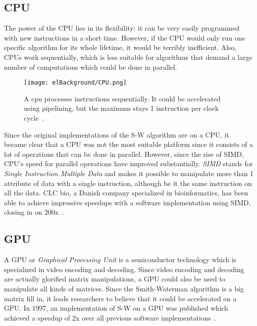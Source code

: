 \subsection{CPU}

The power of the CPU lies in its flexibility: it can be very easily programmed with new instructions in a short time. However, if the CPU would only run one specific algorithm for its whole lifetime, it would be terribly inefficient. Also, CPUs work sequentially, which is less suitable for algorithms that demand a large number of computations which could be done in parallel.

\begin{figure}[H]
	\centering
	\texttt{[image: elBackground/CPU.png]}
	\caption{A cpu processes instructions sequentially. It could be accelerated using pipelining, but the maximum stays 1 instruction per clock cycle~\cite{10}.}
	\label{fig:cpu}
\end{figure}

Since the original implementations of the S-W algorithm are on a CPU, it became clear that a CPU was not the most suitable platform since it consists of a lot of operations that can be done in parallel. However, since the rise of SIMD, CPU's speed for parallel operations have improved substantially. \emph{SIMD} stands for \emph{Single Instruction Multiple Data} and makes it possible to manipulate more than 1 attribute of data with a single instruction, although be it the same instruction on all the data. CLC bio, a Danish company specialized in bioinformatics, has been able to achieve impressive speedups with a software implementation using SIMD, closing in on 200x~\cite{2}.

\subsection{GPU}

A GPU or \emph{Graphical Processing Unit} is a semiconductor technology which is specialized in video encoding and decoding. Since video encoding and decoding are actually glorified matrix manipulations, a GPU could also be used to manipulate all kinds of matrices. Since the Smith-Waterman algorithm is a big matrix fill in, it leads researchers to believe that it could be accelerated on a GPU. In 1997, an implementation of S-W on a GPU was published which achieved a speedup of 2x over all previous software implementations~\cite{gpuImpl}.

